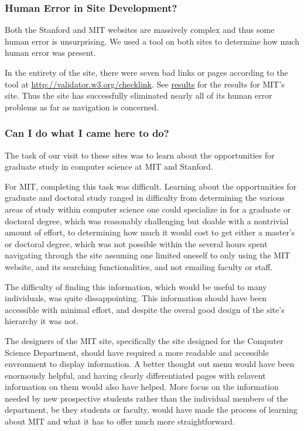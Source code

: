\subsubsection*{Human Error in Site Development?} %

Both the Stanford and MIT websites are massively complex and thus some human error is unsurprising.
We used a tool on both sites to determine how much human error was present.

In the entirety of the site, there were seven bad links or pages according to the tool at
\url{http://validator.w3.org/checklink}. See
\href{http://validator.w3.org/checklink?uri=mit.edu&hide_type=all&depth=&check=Check#results1}{results}
for the results for MIT's site. Thus the site has successfully eliminated nearly all of its
human error problems as far as navigation is concerned.

\subsubsection*{Can I do what I came here to do?}

The task of our visit to these sites was to learn about the opportunities for
graduate study in computer science at MIT and Stanford.

For MIT, completing this task was difficult. Learning about the opportunities for
graduate and doctoral study ranged in difficulty from determining the various areas
of study within computer science one could specialize in for a graduate or doctoral
degree, which was reasonably challenging but doable with a nontrivial amount of effort,
to determining how much it would cost to get either a master's or doctoral degree,
which was not possible within the several hours spent navigating through the site
assuming one limited oneself to only using the MIT website, and its searching
functionalities, and not emailing faculty or staff.

The difficulty of finding this information, which would be useful to many individuals, was
quite dissappointing. This information should have been accessible with minimal effort, and
despite the overal good design of the site's hierarchy it was not.

The designers of the MIT site, specifically the site designed for the Computer Science Department,
should have required a more readable and accessible envronment to display information. A better
thought out menu would have been enormously helpful, and having clearly differentiated pages with
relavent information on them would also have helped. More focus on the information needed by new
prospective students rather than the individual members of the department, be they students or
faculty, would have made the process of learning about MIT and what it has to offer much more
straightforward.

